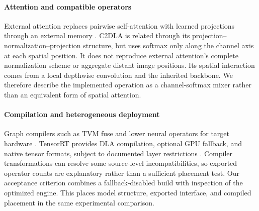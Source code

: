 \paragraph*{Attention and compatible operators}
External attention replaces pairwise self-attention with learned projections
through an external memory \cite{guo2023external}. C2DLA is related through its
projection--normalization--projection structure, but uses softmax only along
the channel axis at each spatial position. It does not reproduce external
attention's complete normalization scheme or aggregate distant image positions.
Its spatial interaction comes from a local depthwise convolution and the
inherited backbone. We therefore describe the implemented operation as a
channel-softmax mixer rather than an equivalent form of spatial attention.

\paragraph*{Compilation and heterogeneous deployment}
Graph compilers such as TVM fuse and lower neural operators for target hardware
\cite{chen2018tvm}. TensorRT provides DLA compilation, optional GPU fallback,
and native tensor formats, subject to documented layer restrictions
\cite{nvidia_dla_working}. Compiler transformations can resolve some
source-level incompatibilities, so exported operator counts are explanatory
rather than a sufficient placement test. Our acceptance criterion combines a
fallback-disabled build with inspection of the optimized engine. This places
model structure, exported interface, and compiled placement in the same
experimental comparison.
